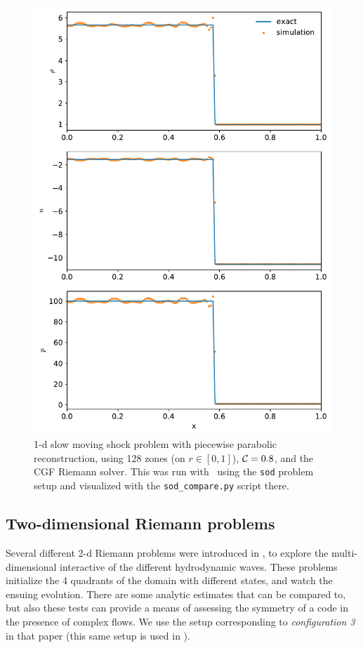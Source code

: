 \begin{figure}[t]
\centering
\includegraphics[width=0.7\linewidth]{slowshock}
\caption[1-d spherical Sedov problem]{\label{fig:Euler:slowshock:ppm} 1-d slow moving shock
  problem with
  piecewise parabolic reconstruction, using 128 zones (on $r \in
  [0,1]$), ${\mathcal{C}} = 0.8$, and the CGF Riemann solver.  This was run
  with \hydrooned\ using the {\tt sod} problem setup and visualized
  with the {\tt sod\_compare.py} script there.}
\end{figure}


\subsection{Two-dimensional Riemann problems}

Several different 2-d Riemann problems were introduced in
\cite{hydro_test_quad}, to explore the multi-dimensional
interactive of the different hydrodynamic waves.  These
problems initialize the 4 quadrants of the domain with different
states, and watch the ensuing evolution.  There are some
analytic estimates that can be compared to, but also these
tests can provide a means of assessing the symmetry of 
a code in the presence of complex flows.  We use the setup
corresponding to {\em configuration 3} in that paper (this
same setup is used in \cite{leveque:1997}).

